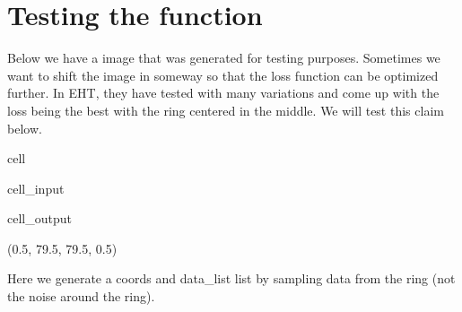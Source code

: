 \documentclass[letterpaper,10pt,english]{jupyterBook}
\begin{document}
\section{Testing the function}
\label{\detokenize{loss:testing-the-function}}
\sphinxAtStartPar
Below we have a image that was generated for testing purposes. Sometimes we want to shift the image in someway so that the loss function can be optimized further. In EHT, they have tested with many variations and come up with the loss being the best with the ring centered in the middle. We will test this claim below.

\begin{sphinxuseclass}{cell}\begin{sphinxVerbatimInput}

\begin{sphinxuseclass}{cell_input}
\begin{sphinxVerbatim}[commandchars=\\\{\}]
   
\end{sphinxVerbatim}

\end{sphinxuseclass}\end{sphinxVerbatimInput}
\begin{sphinxVerbatimOutput}

\begin{sphinxuseclass}{cell_output}
\begin{sphinxVerbatim}[commandchars=\\\{\}]
(\PYGZhy{}0.5, 79.5, 79.5, \PYGZhy{}0.5)
\end{sphinxVerbatim}

\noindent{}

\end{sphinxuseclass}\end{sphinxVerbatimOutput}

\end{sphinxuseclass}
\sphinxAtStartPar
Here we generate a coords and data\_list list by sampling data from the ring (not the noise around the ring).
\end{document}
